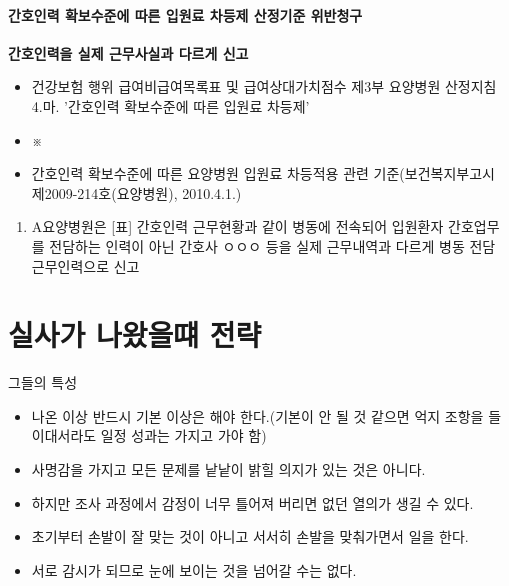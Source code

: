 \paragraph{간호인력 확보수준에 따른 입원료 차등제 산정기준 위반청구}
\textbf{간호인력을 실제 근무사실과 다르게 신고}
\begin{description}\tightlist
\item[관련근거] 
\begin{itemize}\tightlist
\item 건강보험 행위 급여\cntrdot{}비급여목록표 및 급여상대가치점수 제3부 요양병원 산정지침 4.마. '간호인력 확보수준에 따른 입원료 차등제'
\item ※ 
\item 간호인력 확보수준에 따른 요양병원 입원료 차등적용 관련 기준(보건복지부고시 제2009-214호(요양병원), 2010.4.1.)
\end{itemize}

\item[부당사례]
\begin{enumerate}[1)]\tightlist
\item A요양병원은 [표] 간호인력 근무현황과 같이 병동에 전속되어 입원환자 간호업무를 전담하는 인력이 아닌 간호사 ㅇㅇㅇ 등을 실제 근무내역과 다르게 병동 전담 근무인력으로 신고 
\end{enumerate}
\end{description}
\clearpage
\section{실사가 나왔을떄 전략}
\Large{그들의 특성}\normalsize
\par
\medskip
{}
\begin{itemize}\tightlist
\item 나온 이상 반드시 기본 이상은 해야 한다.(기본이 안 될 것 같으면 억지 조항을 들이대서라도 일정 성과는 가지고 가야 함)
\item 사명감을 가지고 모든 문제를 낱낱이 밝힐 의지가 있는 것은 아니다.
\item 하지만 조사 과정에서 감정이 너무 틀어져 버리면 없던 열의가 생길 수 있다.
\end{itemize}

\begin{itemize}\tightlist
\item 초기부터 손발이 잘 맞는 것이 아니고 서서히 손발을 맞춰가면서 일을 한다.
\item 서로 감시가 되므로 눈에 보이는 것을 넘어갈 수는 없다. 
\end{itemize}

